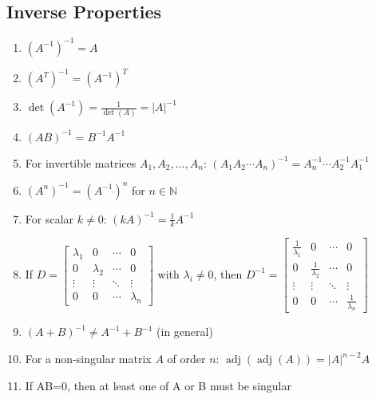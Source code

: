 \documentclass{article}
\DeclareMathOperator{\adj}{adj}  %
\begin{document}
\subsection*{Inverse Properties}  
\begin{enumerate}
    \item \((A^{-1})^{-1} = A\)
    \item \((A^T)^{-1} = (A^{-1})^T\)  
    \item \(\det(A^{-1}) = \frac{1}{\det(A)} = |A|^{-1}\)  
    \item \((AB)^{-1} = B^{-1}A^{-1}\)  
    \item For invertible matrices \(A_1, A_2, \dots, A_n\):  
          \((A_1A_2 \cdots A_n)^{-1} = A_n^{-1} \cdots A_2^{-1}A_1^{-1}\)
    \item \((A^n)^{-1} = (A^{-1})^n\) for \(n \in \mathbb{N}\)
    \item For scalar \(k \neq 0\): \((kA)^{-1} = \frac{1}{k}A^{-1}\)
    \item If \(D = \begin{bmatrix}
        \lambda_1 & 0 & \cdots & 0 \\
        0 & \lambda_2 & \cdots & 0 \\
        \vdots & \vdots & \ddots & \vdots \\
        0 & 0 & \cdots & \lambda_n
    \end{bmatrix}\) with \(\lambda_i \neq 0\), then  
          \(D^{-1} = \begin{bmatrix}
              \frac{1}{\lambda_1} & 0 & \cdots & 0 \\
              0 & \frac{1}{\lambda_2} & \cdots & 0 \\
              \vdots & \vdots & \ddots & \vdots \\
              0 & 0 & \cdots & \frac{1}{\lambda_n}
          \end{bmatrix}\)
    \item \((A + B)^{-1} \neq A^{-1} + B^{-1}\) (in general)
    \item For a non-singular matrix \(A\) of order \(n\):  
          \(\adj(\adj(A)) = |A|^{n-2}A\)
    \item If AB=0, then at least one of A or B must be singular
\end{enumerate}
\end{document}
